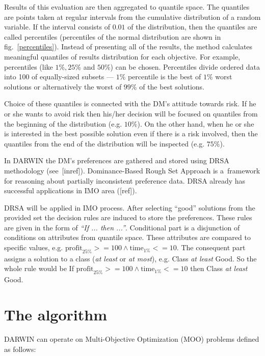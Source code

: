  Results of this evaluation are then aggregated to quantile space. The
 quantiles are points taken at regular intervals from the cumulative
 distribution of a random variable. If the interval consists of $0.01$ of the
 distribution, then the quantiles are called percentiles (percentiles of the
 normal distribution are shown in fig.~\ref{percentiles}). Instead of
 presenting all of the results, the method calculates meaningful quantiles of
 results distribution for each objective. For example, percentiles (like $1\%,
 25\%$ and $50\%$) can be chosen. Percentiles divide ordered data into 100 of
 equally-sized subsets --- $1\%$ percentile is the best of $1\%$ worst
 solutions or alternatively the worst of $99\%$ of the best solutions.

Choice of these quantiles is connected with the DM's attitude towards risk. If
he or she wants to avoid risk then his/her decision will be focused on
quantiles from the beginning of the distribution (e.g. $10\%$). On the other
hand, when he or she is interested in the best possible solution even if there
is a risk involved, then the quantiles from the end of the distribution will
be inspected (e.g. $75\%$).

In DARWIN the DM's preferences are gathered and stored using DRSA methodology
(see~[inref]). Dominance-Based Rough Set Approach is a~framework for reasoning
about partially inconsistent preference data. DRSA already has successful
applications in IMO area ([ref]).

DRSA will be applied in IMO process. After selecting ``good'' solutions from
the provided set the decision rules are induced to store the
preferences. These rules are given in the form of \textit{``If ... then
  ...''}. Conditional part is a disjunction of conditions on attributes from
quantile space. These attributes are compared to specific values, e.g.
$\text{profit}_{25\%} >= 100 \land \text{time}_{1\%} <= 10$. The consequent
part assigns a solution to a class (\textit{at least} or \textit{at most}),
e.g. Class \textit{at least} Good. So the whole rule would be If
$\text{profit}_{25\%} >= 100 \land \text{time}_{1\%} <= 10$ then Class
\textit{at least} Good.

\section{The algorithm}
\label{idea-algo}


DARWIN can operate on Multi-Objective Optimization (MOO) problems defined as
follows:

